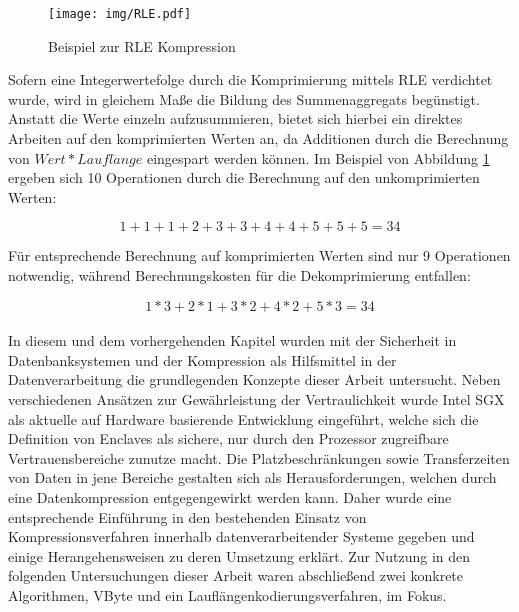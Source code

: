 \begin{figure}
	\texttt{[image: img/RLE.pdf]}
	\centering
	\caption{Beispiel zur RLE Kompression}
	\label{fig:rle}
\end{figure}

Sofern eine Integerwertefolge durch die Komprimierung mittels RLE verdichtet wurde, wird in gleichem Maße die Bildung des Summenaggregats begünstigt. Anstatt die Werte einzeln aufzusummieren, bietet sich hierbei ein direktes Arbeiten auf den komprimierten Werten an, da Additionen durch die Berechnung von $Wert * Laufl\ddot{a}nge$ eingespart werden können. Im Beispiel von Abbildung \ref{fig:rle} ergeben sich 10 Operationen durch die Berechnung auf den unkomprimierten Werten:

\begin{equation*}
	1 + 1 + 1 + 2 + 3 + 3 + 4 + 4 + 5 + 5 + 5 = 34
\end{equation*}

Für entsprechende Berechnung auf komprimierten Werten sind nur 9 Operationen notwendig, während Berechnungskosten für die Dekomprimierung entfallen:

\begin{equation*}
	1 * 3 + 2 * 1 + 3 * 2 + 4 * 2 + 5 * 3 = 34
\end{equation*}

\paragraph{}
In diesem und dem vorhergehenden Kapitel wurden mit der Sicherheit in Datenbanksystemen und der Kompression als Hilfsmittel in der Datenverarbeitung die grundlegenden Konzepte dieser Arbeit untersucht. Neben verschiedenen Ansätzen zur Gewährleistung der Vertraulichkeit wurde Intel SGX als aktuelle auf Hardware basierende Entwicklung eingeführt, welche sich die Definition von Enclaves als sichere, nur durch den Prozessor zugreifbare Vertrauensbereiche zunutze macht. %
Die Platzbeschränkungen sowie Transferzeiten von Daten in jene Bereiche gestalten sich als Herausforderungen, welchen durch eine Datenkompression entgegengewirkt werden kann. Daher wurde eine entsprechende Einführung in den bestehenden Einsatz von Kompressionsverfahren innerhalb datenverarbeitender Systeme gegeben und einige Herangehensweisen zu deren Umsetzung erklärt. Zur Nutzung in den folgenden Untersuchungen dieser Arbeit waren abschließend zwei konkrete Algorithmen, VByte und ein Lauflängenkodierungsverfahren, im Fokus.
